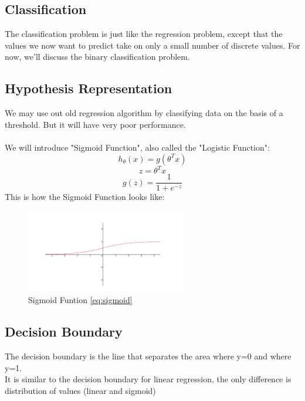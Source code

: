\documentclass[12pt, A4]{report}
\begin{document}
  \subsection{Classification}
    The classification problem is just like the regression problem, except that the values we now want to predict take on only a small number of discrete values. For now, we'll discuss the binary classification problem.

  \subsection{Hypothesis Representation}
    We may use out old regression algorithm by classifying data on the basis of a threshold. But it will have very poor performance.\\ 
    \\We will introduce "Sigmoid Function", also called the "Logistic Function":
    \begin{equation}
      h_\theta(x) = g(\theta^{T}x)
    \end{equation}
    \begin{equation}
      z = \theta^{T}x
    \end{equation}
    \begin{equation}\label{eq:sigmoid}
      g(z) = \frac{1}{1+e^{-z}}
    \end{equation}
    This is how the Sigmoid Function looks like:
    \begin{figure}[h]
      \centering
      \includegraphics[scale = 1]{sigmoid.png}
      \caption{Sigmoid Funtion \ref{eq:sigmoid}}
    \end{figure}

  \subsection{Decision Boundary}
    The decision boundary is the line that separates the area where y=0 and where y=1.\\
    It is similar to the decision boundary for linear regression, the only difference is distribution of values (linear and sigmoid)
\end{document}
